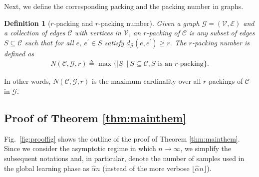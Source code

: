 \documentclass[11pt,onecolumn]{article}
\newcommand{\calC}{\mathcal{C}}
\newcommand{\calE}{\mathcal{E}}
\newcommand{\calG}{\mathcal{G}}
\newcommand{\calV}{\mathcal{V}}
\newcommand{\halpha}{\hat{\alpha}}
\newtheorem{definition}{Definition}
\begin{document}
Next, we define the corresponding packing and the packing number in graphs.
\begin{definition}[$r$-packing and $r$-packing number]
	Given a graph $\calG=(\calV,\calE)$ and a collection of edges $\calC$ with vertices in $\calV$, an $r$-packing of $\calC$ is any subset of edges $S\subseteq\calC$ such that 
	for all $e$, $e^{\prime}\in S$ satisfy $d_{\calG}(e,e^{\prime})\geq r$. The $r$-packing number is defined as
	\begin{align}
		N(\calC,\calG,r)\triangleq\max \{|S| \ | \ S\subseteq\calC , S \text{ is an }r\text{-packing}\}.
	\end{align}
\end{definition}
In other words,  $N(\calC,\calG,r)$ is the maximum cardinality over all  $r$-packings of $\calC$ in $\calG$.
\subsection{Proof of Theorem \ref{thm:mainthem}}
Fig.~\ref{fig:prooffig} shows the outline of the proof of Theorem \ref{thm:mainthem}. Since we consider the asymptotic regime in which  $n\rightarrow\infty$, we  simplify the  subsequent notations and, in particular, denote  the number of samples used in the global learning phase as  $\halpha n$ (instead of the more verbose $\lfloor\halpha n\rfloor$). %
\end{document}
